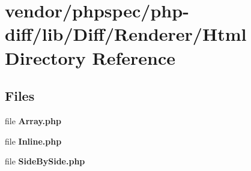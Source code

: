 \section{vendor/phpspec/php-\/diff/lib/\+Diff/\+Renderer/\+Html Directory Reference}
\label{dir_de311c88c06e8290b1e7903ec4ac7da1}
\subsection*{Files}
\begin{DoxyCompactItemize}
\item 
file {\bf Array.\+php}
\item 
file {\bf Inline.\+php}
\item 
file {\bf Side\+By\+Side.\+php}
\end{DoxyCompactItemize}
